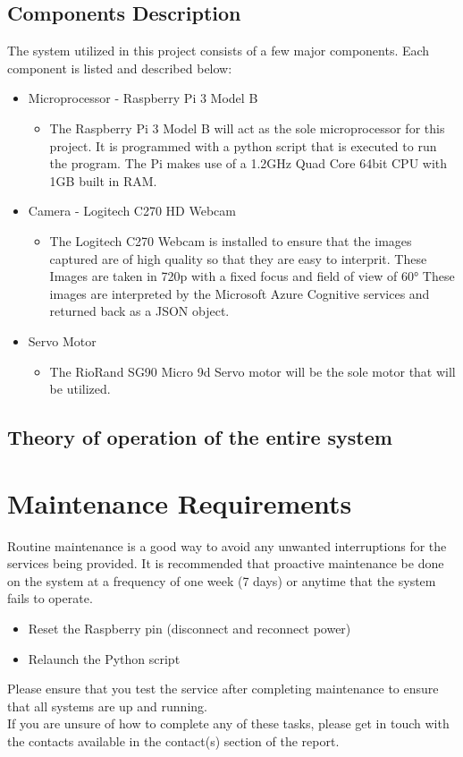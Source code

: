 \documentclass[a4paper,12pt]{article}
\begin{document}
\newpage
\subsection{Components Description}
The system utilized in this project consists of a few major components. Each component is listed and described below:
\begin{itemize}
\item Microprocessor - Raspberry Pi 3 Model B
\begin{itemize}
    \item The Raspberry Pi 3 Model B will act as the sole microprocessor for this project. It is programmed with a python script that is executed to run the program. The Pi makes use of  a 1.2GHz Quad Core 64bit CPU with 1GB built in RAM.
\end{itemize} 
\item Camera - Logitech C270 HD Webcam
\begin{itemize}
    \item The Logitech C270 Webcam is installed to ensure that the images captured are of high quality so that they are easy to interprit. These Images are taken in 720p with a fixed focus and field of view of \ang{60} These images are interpreted by the Microsoft Azure Cognitive services and returned back as a JSON object.
\end{itemize}
\item Servo Motor
\begin{itemize}
    \item The RioRand SG90 Micro 9d Servo motor will be the sole motor that will be utilized. 
\end{itemize}
\end{itemize}

\subsection{Theory of operation of the entire system}

\newpage
\section{Maintenance Requirements}
Routine maintenance is a good way to avoid any unwanted interruptions for the services being provided. It is recommended that proactive maintenance be done on the system at a frequency of one week (7 days) or anytime that the system fails to operate.
\begin{itemize}
    \item Reset the Raspberry pin (disconnect and reconnect power)
    \item Relaunch the Python script
\end{itemize}
Please ensure that you test the service after completing maintenance to ensure that all systems are up and running. \\
If you are unsure of how to complete any of these tasks, please get in touch with the contacts available in the contact(s) section of the report.
\end{document}
